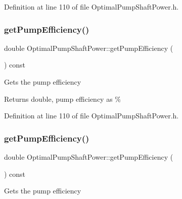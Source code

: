 Definition at line 110 of file Optimal\+Pump\+Shaft\+Power.\+h.

\mbox{\label{class_optimal_pump_shaft_power_a77b9c639438f9d6008c20948f173a2c4}} 
\subsubsection{\texorpdfstring{get\+Pump\+Efficiency()}{getPumpEfficiency()}\hspace{0.1cm}{\footnotesize\ttfamily [2/3]}}
{\footnotesize\ttfamily double Optimal\+Pump\+Shaft\+Power\+::get\+Pump\+Efficiency (\begin{DoxyParamCaption}{ }\end{DoxyParamCaption}) const\hspace{0.3cm}{\ttfamily [inline]}}

Gets the pump efficiency

\begin{DoxyReturn}{Returns}
double, pump efficiency as \% 
\end{DoxyReturn}


Definition at line 110 of file Optimal\+Pump\+Shaft\+Power.\+h.

\mbox{\label{class_optimal_pump_shaft_power_a77b9c639438f9d6008c20948f173a2c4}} 
\subsubsection{\texorpdfstring{get\+Pump\+Efficiency()}{getPumpEfficiency()}\hspace{0.1cm}{\footnotesize\ttfamily [3/3]}}
{\footnotesize\ttfamily double Optimal\+Pump\+Shaft\+Power\+::get\+Pump\+Efficiency (\begin{DoxyParamCaption}{ }\end{DoxyParamCaption}) const\hspace{0.3cm}{\ttfamily [inline]}}

Gets the pump efficiency


